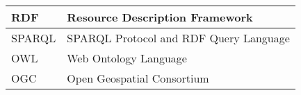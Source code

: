 
\abbreviations
\begin{center}
	\renewcommand{\arraystretch}{1.5}
	\begin{longtable}{ |l @{\qquad} |l| }
  \hline
    RDF    & Resource Description Framework \\ \hline
	  SPARQL & SPARQL Protocol and RDF Query Language \\ \hline
	  OWL    & Web Ontology Language \\ \hline
    OGC & Open Geospatial Consortium \\
	\hline
	\end{longtable}
\end{center}
